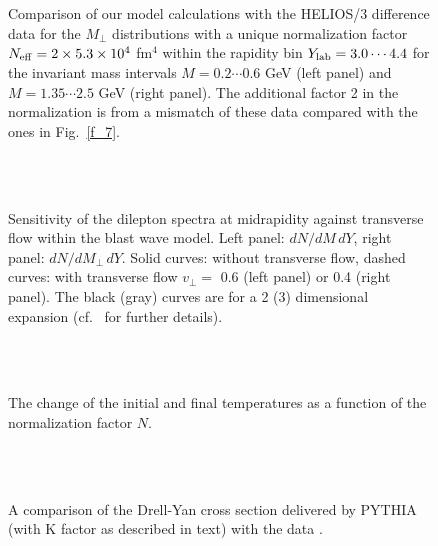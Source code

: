 \begin{figure}[t] %
\centering
~\\[-.1cm]
\hfill
{}
~\\[.5cm]
\caption{
Comparison of our model calculations with the HELIOS/3 difference data
\cite{HELIOS-3} for the $M_\perp$ distributions
with a unique normalization factor
$N_{\rm eff} = 2 \times 5.3 \times 10^4$ fm${}^4$
within the rapidity bin $Y_{\rm lab} = 3.0 \cdots 4.4$
for the invariant mass intervals $M = 0.2 \cdots 0.6$ GeV
(left panel)
and $M = 1.35 \cdots 2.5$ GeV
(right panel).
The additional factor 2 in the normalization is from a mismatch
of these data compared with the ones in Fig.~\protect\ref{f_7}.
}
\label{f_7_1}
\end{figure}

\begin{figure}[t] %
\centering
~\\[-.1cm]
\hfill
{} 
~\\[.5cm]
\caption{
Sensitivity of the dilepton spectra at midrapidity against transverse
flow within the blast wave model.
Left panel: $d N/d M \, d Y$,
right panel: $d N/d M_\perp \, d Y$.
Solid curves: without transverse flow,
dashed curves: with transverse flow $v_\perp =$ 0.6 (left panel) or
0.4 (right panel).
The black (gray) curves are for a 2 (3) dimensional expansion
(cf.\ \protect\cite{Phys.Lett.} for further details).
}
\label{f_11}
\end{figure}

\begin{figure}[t] %
\centering
~\\[-.1cm]
~\\[.5cm]
\caption{
The change of the initial and final temperatures as a function
of the normalization factor $N$.
}
\label{f_16}
\end{figure}

\begin{figure}[t] %
\centering
~\\[-.1cm]
~\\[.5cm]
\caption{
A comparison of the Drell-Yan cross section delivered by PYTHIA
(with K factor as described in text) with the data \cite{DY_K_factor}.
}
\label{f_12}
\end{figure}

